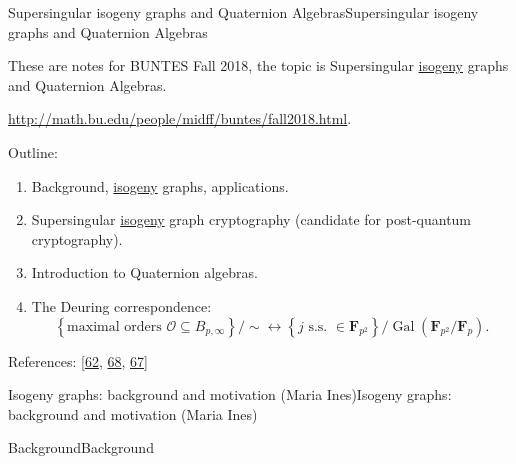 \documentclass[10pt,]{book}
\numberwithin{equation}{section}
\newcommand{\FF}{\mathbf{F}}
\newcommand{\ints}{\mathcal{O}}
\newcommand{\Gal}[2]{\operatorname{Gal}(#1/#2)}
\begin{document}
%
%
\typeout{************************************************}
\typeout{************************************************}
%
\begin{chapterptx}{Supersingular isogeny graphs and Quaternion Algebras}{}{Supersingular isogeny graphs and Quaternion Algebras}{}{}\label{chapter-supersing-isog}
\begin{introduction}{}%
\hypertarget{p-782}{}%
These are notes for BUNTES Fall 2018, the topic is Supersingular \hyperref[def-supersing-isog-isog]{isogeny} graphs and Quaternion Algebras.%
\par
\hypertarget{p-783}{}%
\url{http://math.bu.edu/people/midff/buntes/fall2018.html}.%
\par
\hypertarget{p-784}{}%
Outline:\leavevmode%
\begin{enumerate}
\item\hypertarget{li-178}{}Background, \hyperref[def-supersing-isog-isog]{isogeny} graphs, applications.%
\item\hypertarget{li-179}{}Supersingular \hyperref[def-supersing-isog-isog]{isogeny} graph cryptography (candidate for post-quantum cryptography).%
\item\hypertarget{li-180}{}Introduction to Quaternion algebras.%
\item\hypertarget{li-181}{}The Deuring correspondence:%
\begin{equation*}
\left\{ \text{maximal orders }\ints \subseteq B_{p,\infty}\right\}/\sim \leftrightarrow \left\{ j \text{ s.s. }\in \FF_{p^2}\right\}/\Gal{\FF_{p^2}}{\FF_p}\text{.}
\end{equation*}
%
\end{enumerate}
%
\par
\hypertarget{p-785}{}%
References: [\hyperlink{bib-sutherland}{62}, \hyperlink{bib-voight-quat}{68}, \hyperlink{bib-velu}{67}]%
\end{introduction}%
%
%
\typeout{************************************************}
\typeout{************************************************}
%
\begin{sectionptx}{Isogeny graphs: background and motivation (Maria Ines)}{}{Isogeny graphs: background and motivation (Maria Ines)}{}{}\label{sec-supersing-isog-graphs}
%
%
\typeout{************************************************}
\typeout{************************************************}
%
\begin{subsectionptx}{Background}{}{Background}{}{}\label{subsec-supersing-isog-background}

\end{subsectionptx}
\end{sectionptx}
\end{chapterptx}
\end{document}

